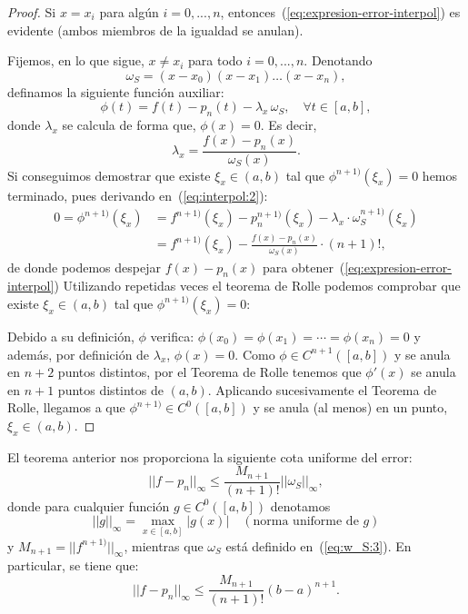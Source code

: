 \begin{proof}
  Si $x=x_i$ para algún $i=0,...,n$,
  entonces~(\ref{eq:expresion-error-interpol}) es evidente (ambos
  miembros de la igualdad se anulan).

  Fijemos, en lo que sigue, $x\neq x_i$ para todo $i=0,...,n$. Denotando
  \begin{equation}
  \omega_S=(x-x_0)(x-x_1)\dots (x-x_n),
 \label{eq:w_S:3} 
\end{equation}
  definamos la siguiente función auxiliar:
  \begin{equation}
    \phi(t)=f(t)-p_n(t)-\lambda_x\, \omega_S, \quad \forall t\in[a,b],
  \label{eq:interpol:2}
\end{equation}
  donde $\lambda_x$ se calcula de forma que, $\phi(x)=0$. Es
  decir,
  $$
  \lambda_x = \frac{f(x)-p_n(x)}{\omega_S(x)}.
  $$
  Si conseguimos demostrar que existe $\xi_x\in (a,b)$ tal que
  $\phi^{n+1)}(\xi_x)=0$ hemos terminado, pues derivando
  en~(\ref{eq:interpol:2}):
  \begin{align*}
    0=\phi^{n+1)}(\xi_x)&=f^{n+1)}(\xi_x)-p_n^{n+1)}(\xi_x)-\lambda_x\cdot\omega_S^{n+1)}(\xi_x)
    \\
    &=f^{n+1)}(\xi_x)- \frac{f(x)-p_n(x)}{\omega_S(x)}\cdot (n+1)!,
  \end{align*}
  de donde podemos despejar $f(x)-p_n(x)$ para
  obtener~(\ref{eq:expresion-error-interpol}) 
  Utilizando repetidas veces el teorema de Rolle podemos comprobar que
  existe $\xi_x\in (a,b)$ tal que $\phi^{n+1)}(\xi_x)=0$:

  Debido a su definición, $\phi$ verifica:
  $\phi(x_0)=\phi(x_1)=\cdots=\phi(x_n)=0$ y además, por definición de
  $\lambda_x$, $\phi(x)=0$. Como $\phi\in C^{n+1}([a,b])$ y se anula
  en $n+2$ puntos distintos, por el Teorema de Rolle tenemos que
  $\phi'(x)$ se anula en $n+1$ puntos distintos de $(a,b)$. Aplicando
  sucesivamente el Teorema de Rolle, llegamos a que $\phi^{n+1)}\in
  C^0([a,b])$ y se anula (al menos) en un punto, $\xi_x\in (a,b)$.
\end{proof}

\begin{remark}
  \label{rk:2}
  El teorema anterior nos proporciona la siguiente cota uniforme del
  error:
  \begin{equation}
    ||f-p_n||_{\infty} \le \frac{M_{n+1}}{(n+1)!}||\omega_S||_\infty,
    \label{eq:cota-error-interpol-1}
  \end{equation}
  donde para cualquier función $g\in C^0([a,b])$ denotamos
  \begin{equation*}
    ||g||_\infty = \max_{x\in[a,b]} |g(x)|  \quad (\text{norma
      uniforme de $g$})
  \end{equation*}
  y $M_{n+1}=||f^{n+1)}||_\infty$, mientras que $\omega_S$ está
  definido en~(\ref{eq:w_S:3}).
  En particular, se tiene que:
  \begin{equation}
    ||f-p_n||_{\infty} \le \frac{M_{n+1}}{(n+1)!}(b-a)^{n+1}.
    \label{eq:cota-error-interpol-2}
  \end{equation}
\end{remark}

